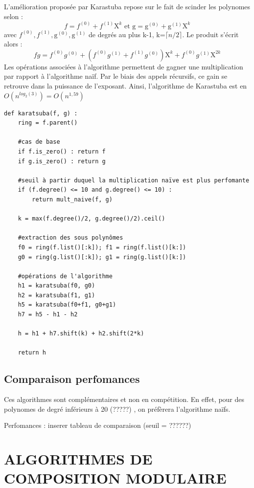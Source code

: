 \documentclass[a4paper]{article}
\begin{document}
L'amélioration proposée par Karastuba repose sur le fait de scinder les polynomes selon :
\[
f=f^{(0)}+f^{(1)}\mathrm{X}^k\text{ et }\mathrm{g} = \mathrm{g}^{(0)}+\mathrm{g}^{(1)}\mathrm{X}^k
\]
avec $f^{(0)}, f^{(1)}, \mathrm{g}^{(0)}, \mathrm{g}^{(1)}$ de degrés au plus k-1, k=$\lceil n/2 \rceil$. Le produit s'écrit alors :
\[
fg = f^{(0)}g^{(0)}+(f^{(0)}g^{(1)}+f^{(1)}g^{(0)})\mathrm{X}^k+f^{(0)}g^{(1)}\mathrm{X}^{2k} 
\]
Les opérations associées à l'algorithme permettent de gagner une multiplication par rapport à l'algorithme naïf. Par le biais des appels récursifs, ce gain se retrouve dans la puissance de l'exposant.
Ainsi, l'algorithme de Karastuba est en $O(n^{log_2(3)}) = O(n^{1,59})$


\begin{lstlisting}[title={karastuba}]
def karatsuba(f, g) :
    ring = f.parent()

    #cas de base
    if f.is_zero() : return f
    if g.is_zero() : return g
    
    #seuil à partir duquel la multiplication naïve est plus perfomante
    if (f.degree() <= 10 and g.degree() <= 10) : 
        return mult_naive(f, g)

    k = max(f.degree()/2, g.degree()/2).ceil()

    #extraction des sous polynômes
    f0 = ring(f.list()[:k]); f1 = ring(f.list()[k:])
    g0 = ring(g.list()[:k]); g1 = ring(g.list()[k:])

    #opérations de l'algorithme
    h1 = karatsuba(f0, g0)
    h2 = karatsuba(f1, g1)
    h5 = karatsuba(f0+f1, g0+g1)
    h7 = h5 - h1 - h2

    h = h1 + h7.shift(k) + h2.shift(2*k)

    return h
\end{lstlisting}


\subsection{Comparaison perfomances}

\cite{aecf} Ces algorithmes sont complémentaires et non en compétition. En effet, pour des polynomes de degré inférieurs à 20 (?????) , on préfèrera l'algorithme naïfs.

Perfomances : inserer tableau de comparaison  (seuil = ??????)

\section{ALGORITHMES DE COMPOSITION MODULAIRE}
\end{document}
